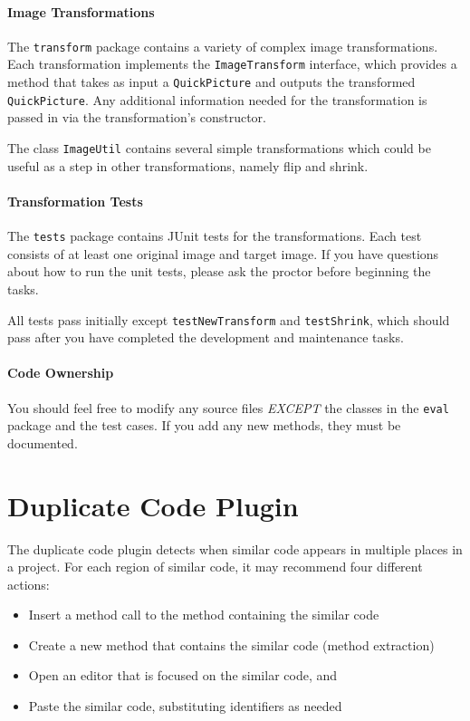\documentclass[12pt]{article}
\begin{document}
\paragraph{Image Transformations}

The \verb|transform| package contains a variety of complex image
transformations.  Each transformation implements the
\verb|ImageTransform| interface, which provides a method that takes as
input a \verb|QuickPicture| and outputs the transformed
\verb|QuickPicture|. Any additional information needed for the
transformation is passed in via the transformation's constructor.

The class \verb|ImageUtil| contains several simple transformations
which could be useful as a step in other transformations, namely flip
and shrink.

\paragraph{Transformation Tests}

The \verb|tests| package contains JUnit tests for the
transformations. Each test consists of at least one original image and
target image. If you have questions about how to run the unit tests,
please ask the proctor before beginning the tasks.

All tests pass initially except \verb|testNewTransform| and \verb|testShrink|, which should pass after you have completed the development and maintenance tasks.

\paragraph{Code Ownership}  
You should feel free to modify any source files \textit{EXCEPT} the classes in
the \verb|eval| package and the test cases.  If you add any new methods,
they must be documented.

\section{Duplicate Code Plugin}
The duplicate code plugin detects when similar code appears in
multiple places in a project. For each region of similar code, it may
recommend four different actions:

\begin{itemize}
  \item Insert a method call to the method containing the similar code
  \item Create a new method that contains the similar code (method extraction)
  \item Open an editor that is focused on the similar code, and
  \item Paste the similar code, substituting identifiers as needed
\end{itemize}
\end{document}
